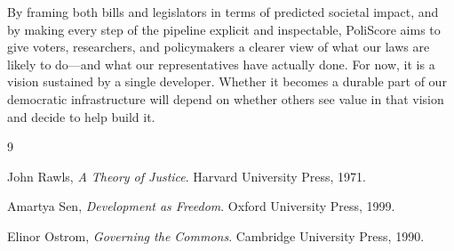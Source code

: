 \documentclass[12pt]{article}
\begin{document}
By framing both bills and legislators in terms of predicted societal impact, and by making every step of the pipeline
explicit and inspectable, PoliScore aims to give voters, researchers, and policymakers a clearer view of what our laws are
likely to do---and what our representatives have actually done. For now, it is a vision sustained by a single developer.
Whether it becomes a durable part of our democratic infrastructure will depend on whether others see value in that vision
and decide to help build it.


\newpage
\begin{thebibliography}{9}

John Rawls,
\textit{A Theory of Justice}.
Harvard University Press, 1971.

Amartya Sen,
\textit{Development as Freedom}.
Oxford University Press, 1999.

Elinor Ostrom,
\textit{Governing the Commons}.
Cambridge University Press, 1990.


\end{thebibliography}
\end{document}
